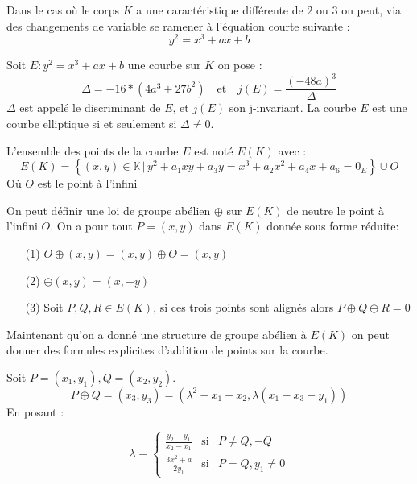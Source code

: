 \documentclass[12pt]{article}
\begin{document}
Dans le cas où le corps $K$ a une caractéristique différente de $2$ ou $3$ on peut, via des changements de variable se ramener à l'équation courte suivante : 
\begin{equation*}
y^2 = x^3 + ax +b
\end{equation*}

\begin{defi}
Soit $E : y^2 = x^3 + ax +b$ une courbe sur $K$ on pose : 
\begin{equation*}
\Delta = -16*(4a^3 + 27b^2) \quad \text{et} \quad j(E) = \frac{(-48a)^3}{\Delta}
\end{equation*}
$\Delta$ est appelé le discriminant de $E$, et $j(E)$ son j-invariant. La courbe $E$ est une courbe elliptique si et seulement si $\Delta \ne 0$.
\end{defi}

\begin{defi}
L'ensemble des points de la courbe $E$ est noté $E(K)$ avec :
\begin{equation*}
E(K) = \left\{ (x,y) \in \mathbb{K} \, | \, y^2 + a_1xy + a_3y  = x^3 + a_2x^2 + a_4x + a_6 = 0_E \right\} \cup {O}
\end{equation*}
Où $O$ est le point à l'infini
\end{defi}


On peut définir une loi de groupe abélien $\oplus$ sur $E(K)$ de neutre le point à l'infini $O$. On a pour tout $P = (x,y) $ dans $E(K)$ donnée sous forme réduite:
\begin{itemize}
\item[(1)] $O \oplus (x,y) = (x,y) \oplus O = (x,y)$
\item[(2)] $\ominus (x,y) = (x, -y)$
\item[(3)] Soit $P,Q,R \in E(K)$, si ces trois points sont alignés alors $P \oplus Q \oplus R = 0$
\end{itemize}

Maintenant qu'on a donné une structure de groupe abélien à $E(K)$ on peut donner des formules explicites d'addition de points sur la courbe.

\begin{prop}
Soit $P =(x_1, y_1), Q=(x_2, y_2)$.
$$P \oplus Q = (x_3, y_3) = (\lambda^2 -x_1 -x_2, \lambda(x_1 - x_3 - y_1)) $$
En posant : 

\begin{equation}
\lambda =
\left\lbrace
\begin{array}{ccc}
\frac{y_2 - y_1}{x_2 - x_1} & \mbox{si} & P \ne Q, -Q  \\
\frac{3x^2 + a}{2y_1} & \mbox{si}  & P = Q, y_1 \ne 0
\end{array}\right.
\end{equation}
\end{prop}
\end{document}
